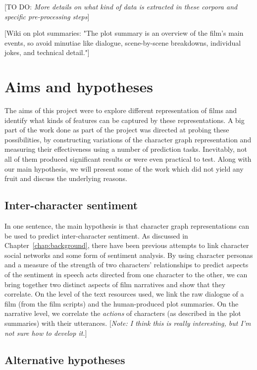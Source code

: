 \documentclass[bsc,frontabs,singlespacing,parskip, twoside]{infthesis}
\begin{document}
[TO DO: \textit{More details on what kind of data is extracted in these corpora and specific pre-processing steps}]

[Wiki on plot summaries: "The plot summary is an overview of the film's main events, so avoid minutiae like dialogue, scene-by-scene breakdowns, individual jokes, and technical detail."]

\chapter{Aims and hypotheses}
\label{chap:aims}

The aims of this project were to explore different representation of films and identify what kinds of features can be captured by these representations. A big part of the work done as part of the project was directed at probing these possibilities, by constructing variations of the character graph representation and measuring their effectiveness using a number of prediction tasks. Inevitably, not all of them produced significant results or were even practical to test. Along with our main hypothesis, we will present some of the work which did not yield any fruit and discuss the underlying reasons.

\section{Inter-character sentiment}
In one sentence, the main hypothesis is that character graph representations can be used to predict inter-character sentiment. As discussed in Chapter~\ref{chap:background}, there have been previous attempts to link character social networks and some form of sentiment analysis. By using character personas and a measure of the strength of two characters' relationships to predict aspects of the sentiment in speech acts directed from one character to the other, we can bring together two distinct aspects of film narratives and show that they correlate. On the level of the text resources used, we link the raw dialogue of a film (from the film scripts) and the human-produced plot summaries. On the narrative level, we correlate the \textit{actions} of characters (as described in the plot summaries) with their utterances. [\textit{Note: I think this is really interesting, but I'm not sure how to develop it.}]

\section{Alternative hypotheses}
\end{document}
